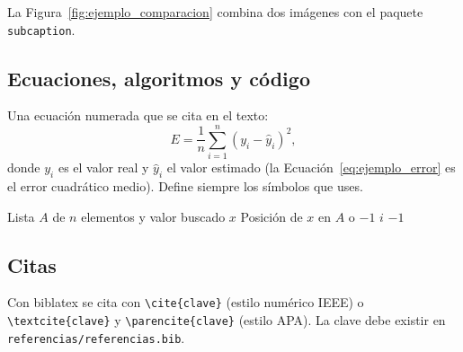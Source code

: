 La Figura~\ref{fig:ejemplo_comparacion} combina dos imágenes con el paquete \verb|subcaption|.

\subsection{Ecuaciones, algoritmos y código}

Una ecuación numerada que se cita en el texto:
\begin{equation}
  \label{eq:ejemplo_error}
  E = \frac{1}{n}\sum_{i=1}^{n}\left(y_i - \hat{y}_i\right)^2 ,
\end{equation}
donde $y_i$ es el valor real y $\hat{y}_i$ el valor estimado (la Ecuación~\ref{eq:ejemplo_error} es el error cuadrático
medio). Define siempre los símbolos que uses.

\begin{algorithm}[H]
  \caption{Búsqueda lineal.}
  \label{alg:ejemplo_busqueda}
  \begin{algorithmic}[1]
    \Require Lista $A$ de $n$ elementos y valor buscado $x$
    \Ensure Posición de $x$ en $A$ o $-1$
       \State \Return $i$ \EndIf
    \EndFor
    \State \Return $-1$
  \end{algorithmic}
\end{algorithm}

\subsection{Citas}

Con biblatex se cita con \verb|\cite{clave}| (estilo numérico IEEE) o \verb|\textcite{clave}| y \verb|\parencite{clave}|
(estilo APA). La clave debe existir en \texttt{referencias/referencias.bib}.

